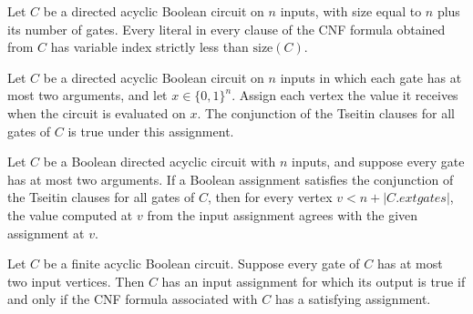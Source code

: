 \begin{theorem}
\label{BoolCircuit.DAGCircuit.toCNF_var_lt_size}
\leanok
{}
Let $C$ be a directed acyclic Boolean circuit on $n$ inputs, with size equal to $n$ plus
its number of gates. Every literal in every clause of the CNF formula obtained from $C$
has variable index strictly less than $\mathrm{size}(C)$.
\end{theorem}

\begin{theorem}
\label{BoolCircuit.DAGCircuit.eval_tseitinGates_values}
\leanok
{}
Let $C$ be a directed acyclic Boolean circuit on $n$ inputs in which each gate has at
most two arguments, and let $x\in\{0,1\}^n$. Assign each vertex the value it receives
when the circuit is evaluated on $x$. The conjunction of the Tseitin clauses for all
gates of $C$ is true under this assignment.
\end{theorem}

\begin{theorem}
\label{BoolCircuit.DAGCircuit.values_getD_eq_of_eval_tseitinGates}
\leanok
{}
Let $C$ be a Boolean directed acyclic circuit with $n$ inputs, and suppose every gate
has at most two arguments. If a Boolean assignment satisfies the conjunction of the
Tseitin clauses for all gates of $C$, then for every vertex $v<n+|C.	ext{gates}|$, the
value computed at $v$ from the input assignment agrees with the given assignment at $v$.
\end{theorem}

\begin{theorem}
\label{BoolCircuit.DAGCircuit.satisfiable_iff_toCNF_satisfiable}
\leanok
{}
Let $C$ be a finite acyclic Boolean circuit. Suppose every gate of $C$ has at most two
input vertices. Then $C$ has an input assignment for which its output is true if and
only if the CNF formula associated with $C$ has a satisfying assignment.
\end{theorem}

